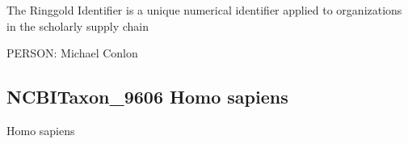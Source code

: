 \documentclass[letterpaper,10pt,english]{sphinxmanual}
\begin{document}
\begin{sphinxShadowBox}

\sphinxAtStartPar
{\hyperref[\detokenize{doc-IAO_0000578::doc}]{}}
\end{sphinxShadowBox}

\begin{sphinxShadowBox}

\sphinxAtStartPar
The Ringgold Identifier is a unique numerical identifier applied to organizations in the scholarly supply chain
\end{sphinxShadowBox}

\begin{sphinxShadowBox}

\sphinxAtStartPar
{}
\end{sphinxShadowBox}

\begin{sphinxShadowBox}

\sphinxAtStartPar
{}
\end{sphinxShadowBox}

\begin{sphinxShadowBox}

\sphinxAtStartPar
PERSON: Michael Conlon
\end{sphinxShadowBox}
\begin{quote}

\ignorespaces \end{quote}


\subsection{NCBITaxon\_9606 \sphinxhyphen{} Homo sapiens}
\label{\detokenize{doc-NCBITaxon_9606:ncbitaxon-9606-homo-sapiens}}\label{\detokenize{doc-NCBITaxon_9606:index-0}}\label{\detokenize{doc-NCBITaxon_9606::doc}}
\begin{sphinxShadowBox}

\sphinxAtStartPar
Homo sapiens
\end{sphinxShadowBox}
\end{document}
